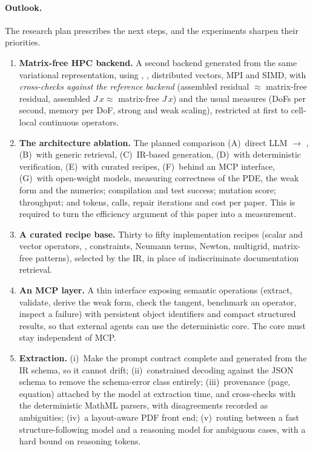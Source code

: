 \paragraph{Outlook.}
\label{sec:outlook}
The research plan prescribes the next steps, and the experiments sharpen their priorities.
\begin{enumerate}
\item \textbf{Matrix-free HPC backend.} A second backend generated from the same variational representation, using , , distributed vectors, MPI and SIMD, with \emph{cross-checks against the reference backend} (assembled residual $\approx$ matrix-free residual, assembled $J\,x\approx$ matrix-free $J\,x$) and the usual measures (DoFs per second, memory per DoF, strong and weak scaling), restricted at first to cell-local continuous operators.
\item \textbf{The architecture ablation.} The planned comparison (A)~direct LLM $\to$ \dealii{}, (B)~with generic retrieval, (C)~IR-based generation, (D)~with deterministic verification, (E)~with curated recipes, (F)~behind an MCP interface, (G)~with open-weight models, measuring correctness of the PDE, the weak form and the numerics; compilation and test success; mutation score; throughput; and tokens, calls, repair iterations and cost per paper. This is required to turn the efficiency argument of this paper into a measurement.
\item \textbf{A curated \dealii{} recipe base.} Thirty to fifty implementation recipes (scalar and vector operators, , constraints, Neumann terms, Newton, multigrid, matrix-free patterns), selected by the IR, in place of indiscriminate documentation retrieval.
\item \textbf{An MCP layer.} A thin interface exposing semantic operations (extract, validate, derive the weak form, check the tangent, benchmark an operator, inspect a failure) with persistent object identifiers and compact structured results, so that external agents can use the deterministic core. The core must stay independent of MCP.
\item \textbf{Extraction.} (i)~Make the prompt contract complete and generated from the IR schema, so it cannot drift; (ii)~constrained decoding against the JSON schema to remove the schema-error class entirely; (iii)~provenance (page, equation) attached by the model at extraction time, and cross-checks with the deterministic MathML parsers, with disagreements recorded as ambiguities; (iv)~a layout-aware PDF front end; (v)~routing between a fast structure-following model and a reasoning model for ambiguous cases, with a hard bound on reasoning tokens.

\end{enumerate}
